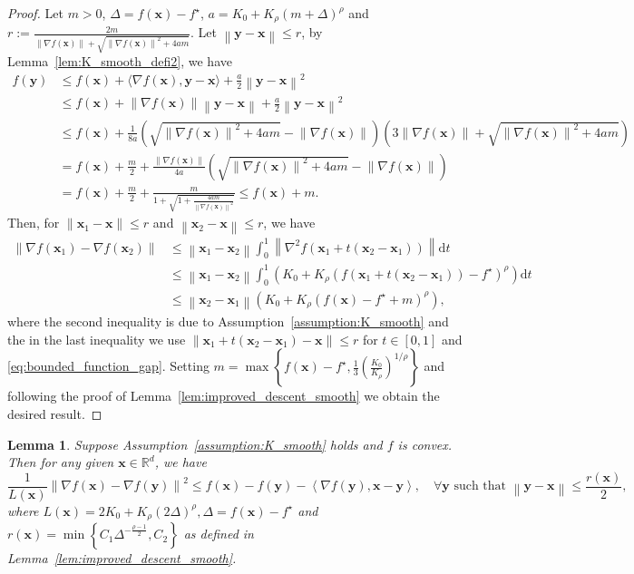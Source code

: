 \documentclass{article}
\newtheorem{lemma}{Lemma}
\newcommand{\Norm}[1]{\left\|#1\right\|}
\newcommand{\dotprod}[2]{\left\langle#1,#2\right\rangle}
\newcommand{\Kr}{K_{\rho}}
\newcommand{\paren}[1]{\left( #1 \right)}
\newcommand{\bx}{\mathbf{x}}
\newcommand{\by}{\mathbf{y}}
\begin{document}
\begin{proof}
    Let $m>0$, $\Delta=f(\bx)-f^\star$, $a=K_0+\Kr\paren{m+\Delta}^\rho$ and 
    $r:=\frac{2m}{\Norm{\nabla f(\bx)}+\sqrt{\Norm{\nabla f(\bx)}^2+4am}}$.
    Let $\Norm{\by-\bx}\leq r$, by Lemma~\ref{lem:K_smooth_defi2}, we have 
    \begin{equation}\label{eq:bounded_function_gap}
        \begin{aligned}
            f(\by)&\leq f(\bx)+\langle\nabla f(\bx),\by-\bx\rangle + \frac{a}{2}\Norm{\by-\bx}^2\\
        &\leq f(\bx)+\Norm{\nabla f(\bx)}\Norm{\by-\bx}+\frac{a}{2}\Norm{\by-\bx}^2\\
        &\leq f(\bx)+\frac{1}{8a}\paren{\sqrt{\Norm{\nabla f(\bx)}^2+4am}-\Norm{\nabla f(\bx)}}\paren{3\Norm{\nabla f(\bx)}+\sqrt{\Norm{\nabla f(\bx)}^2+4am}}\\
        & =f(\bx)+\frac{m}{2} + \frac{\Norm{\nabla f(\bx)}}{4a}\paren{\sqrt{\Norm{\nabla f(\bx)}^2+4am}-\Norm{\nabla f(\bx)}}\\
        &=f(\bx)+\frac{m}{2}+\frac{m}{1+\sqrt{1+\frac{4am}{\Norm{\nabla f(\bx)}^2}}}\leq f(\bx)+m.
        \end{aligned}
    \end{equation}
    Then, for $\|\bx_1-\bx\|\leq r$ and $\Norm{\bx_2-\bx}\leq r$, we have
    \begin{align*}
        \Norm{\nabla f(\bx_1)-\nabla f(\bx_2)}&\leq \Norm{\bx_1-\bx_2}\int_{0}^1\Norm{\nabla^2 f\left(\bx_1+t\paren{\bx_2-\bx_1}\right)}\mathrm{d}t\\
        &\leq \Norm{\bx_1-\bx_2}\int_0^1\paren{K_0+K_\rho \paren{f(\bx_1+t(\bx_2-\bx_1))-f^\star}^\rho}\mathrm{d}t\\
        &\leq \Norm{\bx_2-\bx_1}\paren{K_0+\Kr\paren{f(\bx)-f^\star+m}^\rho},
    \end{align*}
    where the second inequality is due to Assumption~\ref{assumption:K_smooth} and the in the last inequality we use $\Norm{\bx_1+t(\bx_2-\bx_1)-\bx}\leq r$ for $t\in [0,1]$ and 
    \eqref{eq:bounded_function_gap}. Setting $m=\max\left\{f(\bx)-f^\star, \frac{1}{3}\paren{\frac{K_0}{K_\rho}}^{1/\rho}\right\}$ and following the proof of Lemma~\ref{lem:improved_descent_smooth} 
    we obtain the desired result. 
\end{proof}

\begin{lemma}\label{lem:cocoercivity}
    Suppose Assumption~\ref{assumption:K_smooth} holds and $f$ is convex. Then for any given $\bx\in\mathbb{R}^d$, we have
    $$\frac{1}{L(\bx)}\Norm{\nabla f(\bx)-\nabla f(\by)}^2\leq f(\bx)-f(\by)-\dotprod{\nabla f(\by)}{\bx-\by}, \quad \forall \by \text{ such that } \Norm{\by-\bx}\leq \frac{r(\bx)}{2},$$
    where $L(\bx)=2K_0+\Kr\paren{2\Delta}^\rho, \Delta=f(\bx)-f^\star$ and $r(\bx)=\min\left\{C_1\Delta^{-\frac{\rho-1}{2}}, C_2\right\}$ as defined in Lemma~\ref{lem:improved_descent_smooth}.
\end{lemma}
\end{document}
